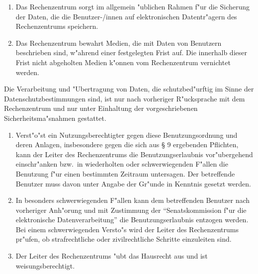
\begin{enumerate}
  \item Das Rechenzentrum sorgt im allgemein "ublichen Rahmen f"ur
    die Sicherung der Daten, die die Benutzer-/innen auf elektronischen
    Datentr"agern des Rechenzentrums speichern.

  \item Das Rechenzentrum bewahrt Medien, die mit Daten von Benutzern
    beschrieben sind, w"ahrend einer festgelegten Frist auf. Die
    innerhalb dieser Frist nicht abgeholten Medien k"onnen vom
    Rechenzentrum vernichtet werden.
\end{enumerate}


Die Verarbeitung und "Ubertragung von Daten, die schutzbed"urftig
im Sinne der Datenschutzbestimmungen sind, ist nur nach vorheriger R"ucksprache
mit dem Rechenzentrum und nur unter Einhaltung der vorgeschriebenen
Sicherheitsma"snahmen gestattet.


\begin{enumerate}
  \item Verst"o"st ein Nutzungsberechtigter gegen diese
    Benutzungsordnung und deren Anlagen, insbesondere gegen die sich aus
    \S{} 9 ergebenden Pflichten, kann der Leiter des Rechenzentrums die
    Benutzungserlaubnis vor"ubergehend einschr"anken bzw.\  in
    wiederholten oder schwerwiegenden F"allen die Benutzung f"ur
    einen bestimmten Zeitraum untersagen. Der betreffende Benutzer
    muss davon unter Angabe der Gr"unde in Kenntnis gesetzt werden.

  \item In besonders schwerwiegenden F"allen kann dem betreffenden Benutzer
    nach vorheriger Anh"orung und mit Zustimmung der "`Senatskommission
    f"ur die elektronische Datenverarbeitung"' die Benutzungserlaubnis
    entzogen werden. Bei einem schwerwiegenden Versto"s wird der
    Leiter des Rechenzentrums pr"ufen, ob strafrechtliche oder
    zivilrechtliche Schritte einzuleiten sind.

  \item Der Leiter des Rechenzentrums "ubt das Hausrecht aus und ist
    weisungsberechtigt.
\end{enumerate}



